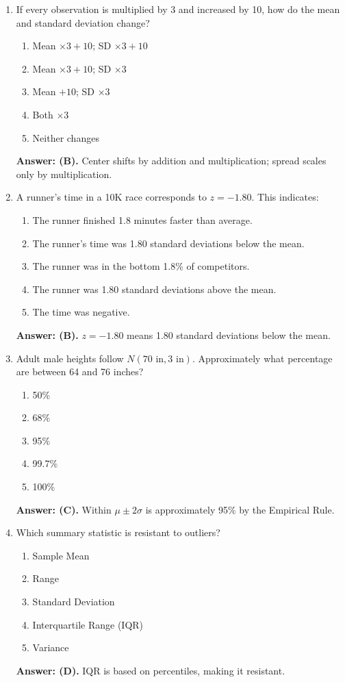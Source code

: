 \begin{enumerate}[leftmargin=1.5em]
  \item If every observation is multiplied by 3 and increased by 10, how do the mean and standard deviation change?
  \begin{enumerate}[label=(\Alph*)]
    \item Mean $\times 3 + 10$; SD $\times 3 + 10$ \item Mean $\times 3 + 10$; SD $\times 3$ \item Mean $+ 10$; SD $\times 3$ \item Both $\times 3$ \item Neither changes
  \end{enumerate}
  \textbf{Answer: (B).} Center shifts by addition and multiplication; spread scales only by multiplication.

  \item A runner's time in a 10K race corresponds to $z = -1.80$. This indicates:
  \begin{enumerate}[label=(\Alph*)]
    \item The runner finished 1.8 minutes faster than average.
    \item The runner's time was 1.80 standard deviations below the mean.
    \item The runner was in the bottom 1.8\% of competitors.
    \item The runner was 1.80 standard deviations above the mean.
    \item The time was negative.
  \end{enumerate}
  \textbf{Answer: (B).} $z = -1.80$ means 1.80 standard deviations below the mean.

  \item Adult male heights follow $N(70\text{ in}, 3\text{ in})$. Approximately what percentage are between 64 and 76 inches?
  \begin{enumerate}[label=(\Alph*)]
    \item 50\% \item 68\% \item 95\% \item 99.7\% \item 100\%
  \end{enumerate}
  \textbf{Answer: (C).} Within $\mu \pm 2\sigma$ is approximately 95\% by the Empirical Rule.

  \item Which summary statistic is resistant to outliers?
  \begin{enumerate}[label=(\Alph*)]
    \item Sample Mean \item Range \item Standard Deviation \item Interquartile Range (IQR) \item Variance
  \end{enumerate}
  \textbf{Answer: (D).} IQR is based on percentiles, making it resistant.


\end{enumerate}
